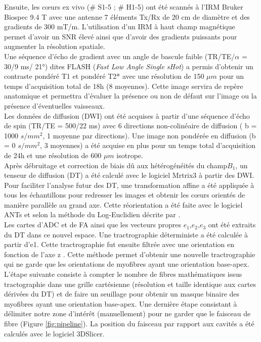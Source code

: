 Ensuite, les cœurs ex vivo (\# S1-5 ; \# H1-5) ont été scannés à l’IRM Bruker Biospec 9.4 T avec une antenne 7 éléments Tx/Rx de 20 cm de diamètre et des gradients de 300 mT/m.  L’utilisation d’un IRM à haut champ magnétique permet d’avoir un SNR élevé ainsi que d’avoir des gradients puissants pour augmenter la résolution spatiale. 
\\
Une séquence d’écho de gradient avec un angle de bascule faible (TR/TE/$\alpha$ = 30/9 ms/ 21$°$) dites FLASH (\textit{Fast Low Angle Single sHot}) a permis d’obtenir un contraste pondéré T1 et pondéré T2* avec une résolution de 150 $\mu m$ pour un temps d’acquisition total de 18h (8 moyennes). Cette image servira de repère anatomique et permettra d’évaluer la présence ou non de défaut sur l’image ou la présence d’éventuelles vaisseaux. 
\\
Les données de diffusion (DWI) ont été acquises à partir d’une séquence d’écho de spin (TR/TE = 500/22 ms) avec 6 directions non-colinéaire de diffusion ( b = 1000 $s/mm^2$, 1 moyenne par directions). Une image non pondérée en diffusion (b = 0 $s/mm^2$, 3 moyennes) a été acquise en plus pour un temps total d’acquisition de 24h et une résolution de 600 $\mu m$ isotrope.
\\
Après débruitage et correction de biais dû aux hétérogénéités du champ$ B_1$, un tenseur de diffusion (DT) a été calculé avec le logiciel Mrtrix3 à partir des DWI. Pour faciliter l’analyse futur des DT, une transformation affine a été appliquée à tous les échantillons pour redresser les images et obtenir les cœurs orientés de manière parallèle au grand axe. Cette réorientation a été faite avec le logiciel ANTs et selon la méthode du Log-Euclidien décrite par \cite{Arsigny2006}.  
\\
Les cartes d’ADC et de FA ainsi que les vecteurs propres $e_1$,$e_2$,$e_3$ ont été extraits du DT dans ce nouvel espace. Une tractrographie déterministe \cite{Mori1999} a été calculée à partir d’e1. Cette tractrographie fut ensuite filtrée avec une orientation en fonction de l’axe z . Cette méthode permet d’obtenir une nouvelle tractrographie qui ne garde que les orientations de myofibres ayant une orientation base-apex. L’étape suivante consiste à compter le nombre de fibres mathématiques issus tractographie dans une grille cartésienne (résolution et taille identique aux cartes dérivées du DT) et de faire un seuillage pour obtenir un masque binaire des myofibres ayant une orientation base-apex. Une dernière étape consistant à délimiter notre zone d’intérêt (manuellement) pour ne garder que le faisceau de fibre (Figure \ref{fig:pipeline}).
La position du faisceau par rapport aux cavités a été calculés avec le logiciel 3DSlicer.

